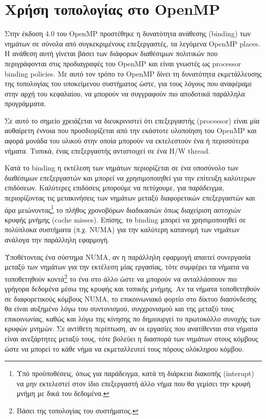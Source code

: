 \newpage

\section{Χρήση τοπολογίας στο OpenMP}
\label{sec:Topology in OpenMP}
Στην έκδοση 4.0 του OpenMP προστέθηκε η δυνατότητα ανάθεσης (binding) των νημάτων σε σύνολα από συγκεκριμένους επεξεργαστές, τα λεγόμενα OpenMP places. Η ανάθεση αυτή γίνεται βάσει των διάφορων διαθέσιμων πολιτικών που περιγράφονται στις προδιαγραφές του OpenMP και είναι γνωστές ως processor binding policies. Με αυτό τον τρόπο το OpenMP δίνει τη δυνατότητα εκμετάλλευσης της τοπολογίας του υποκείμενου συστήματος ώστε, για τους λόγους που αναφέραμε στην αρχή του κεφαλαίου, να μπορούν να συγγραφούν πιο αποδοτικά παράλληλα προγράμματα.

Σε αυτό το σημείο χρειάζεται να διευκρινιστεί ότι επεξεργαστής (processor) είναι μία αυθαίρετη έννοια που προσδιορίζεται από την εκάστοτε υλοποίηση του OpenMP και αφορά μονάδα του υλικού στην οποία μπορούν να εκτελεστούν ένα ή περισσότερα νήματα. Τυπικά, ένας επεξεργαστής αντιστοιχεί σε ένα H/W thread.

Κατά το binding η εκτέλεση των νημάτων περιορίζεται σε ένα υποσύνολο των διαθέσιμων επεξεργαστών και μπορεί να χρησιμοποιηθεί για την επίτευξη καλύτερων επιδόσεων. Καλύτερες επιδόσεις μπορούμε να πετύχουμε, για παράδειγμα, περιορίζοντας τις μετακινήσεις των νημάτων μεταξύ διαφορετικών επεξεργαστών και άρα μειώνοντας\footnote{Υπό προϋποθέσεις, όπως για παράδειγμα, κατά τη διάρκεια διακοπής (interupt) να μην εκτελεστεί στον ίδιο επεξεργαστή άλλο νήμα που θα γεμίσει την κρυφή μνήμη με δικά του δεδομένα.} το πλήθος χρονοβόρων διαδικασιών όπως διαχείριση αστοχιών κρυφής μνήμης (cache misses). Επίσης, το binding μπορεί να χρησιμοποιηθεί σε πολύπλοκα συστήματα (π.χ. NUMA) για την καλύτερη κατανομή των νημάτων ανάλογα την παράλληλη εφαρμογή.

Υποθέτοντας ένα σύστημα NUMA, αν η παράλληλη εφαρμογή απαιτεί συνεργασία μεταξύ των νημάτων για την εκτέλεση μίας εργασίας, τότε συμφέρει τα νήματα να τοποθετηθούν κοντά\footnote{Βάσει της τοπολογίας του συστήματος.} το ένα στο άλλο ώστε να μπορούν να ανταλλάσσουν πιο γρήγορα δεδομένα μέσω της κρυφής και τοπικής μνήμης. Αν τα νήματα τοποθετηθούν σε διαφορετικούς κόμβους NUMA, το επικοινωνιακό φορτίο στο δίκτυο διασύνδεσης θα είναι αυξημένο λόγω του συντονισμού, συγχρονισμού και της μεταξύ τους επικοινωνίας, καθώς και λόγω της κίνησης πο δημιουργεί το πρωτοκόλλο συνοχής των κρυφών μνημών. Σε αντίθετη περίπτωση, αν οι εργασίες που ανατίθενται στα νήματα είναι ανεξάρτητες μεταξύ τους, τότε βολεύει η διασπορά των νημάτων στους κόμβους ώστε να μπορεί το κάθε νήμα να εκμεταλλευτεί τους πόρους ολόκληρου κόμβου.


